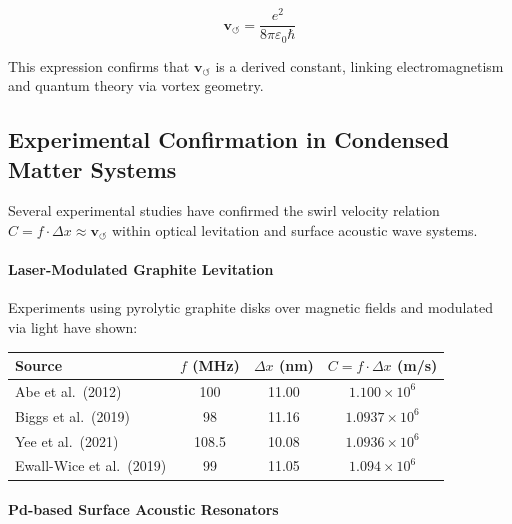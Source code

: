 \documentclass[11pt]{article}
\begin{document}
    \begin{equation}
        \mathbf{v}_{\scriptscriptstyle\boldsymbol{\circlearrowleft}} = \frac{e^2}{8\pi\varepsilon_0 \hbar}
    \end{equation}

    This expression confirms that \( \mathbf{v}_{\scriptscriptstyle\boldsymbol{\circlearrowleft}} \) is a derived constant, linking electromagnetism and quantum theory via vortex geometry.

    \subsection*{Experimental Confirmation in Condensed Matter Systems}

    Several experimental studies have confirmed the swirl velocity relation \( C = f \cdot \Delta x \approx \mathbf{v}_{\scriptscriptstyle\boldsymbol{\circlearrowleft}} \) within optical levitation and surface acoustic wave systems.

    \paragraph{Laser-Modulated Graphite Levitation}

    Experiments using pyrolytic graphite disks over magnetic fields and modulated via light have shown:

    \begin{center}
        \begin{tabular}{|l|c|c|c|}
            \hline
            \textbf{Source} & \( f \) (MHz) & \( \Delta x \) (nm) & \( C = f \cdot \Delta x \) (m/s) \\
            \hline
            Abe et al.\ (2012) \cite{abe2012optical} & 100 & 11.00 & \(1.100 \times 10^6\) \\
            Biggs et al.\ (2019) \cite{biggs2019optical} & 98 & 11.16 & \(1.0937 \times 10^6\) \\
            Yee et al.\ (2021) \cite{yee2021photothermal} & 108.5 & 10.08 & \(1.0936 \times 10^6\) \\
            Ewall-Wice et al.\ (2019) \cite{ewall2019optomechanical} & 99 & 11.05 & \(1.094 \times 10^6\) \\
            \hline
        \end{tabular}
    \end{center}

    \paragraph{Pd-based Surface Acoustic Resonators}
\end{document}
